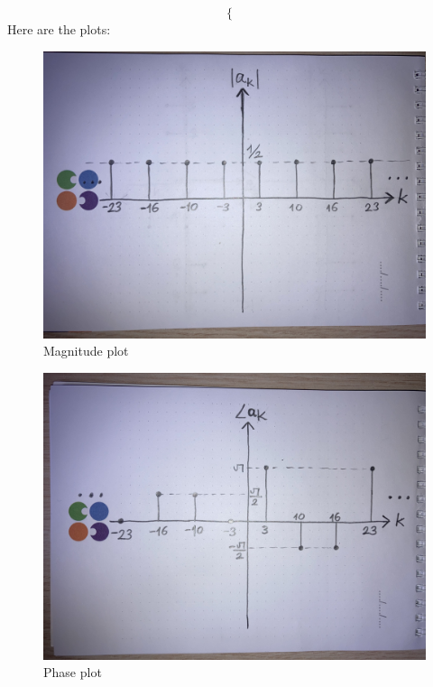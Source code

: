 \documentclass[10pt,a4paper, margin=1in]{article}
\begin{document}
\begin{enumerate}
\begin{enumerate}
$$\begin{cases}
        \end{cases}
    $$
    Here are the plots:
    \begin{figure}[htbp]
        \centering
            \includegraphics[width=1\textwidth]{q5b_magnitude.jpg}
            \caption{Magnitude plot}
            \label{fig:q5b_mag}
    \end{figure}

    \begin{figure}[htbp]
        \centering
            \includegraphics[width=1\textwidth]{q5b_phase.jpg}
            \caption{Phase plot}
            \label{fig:q5b_pha}
    \end{figure}
    \end{enumerate}


\end{enumerate}
\end{document}
